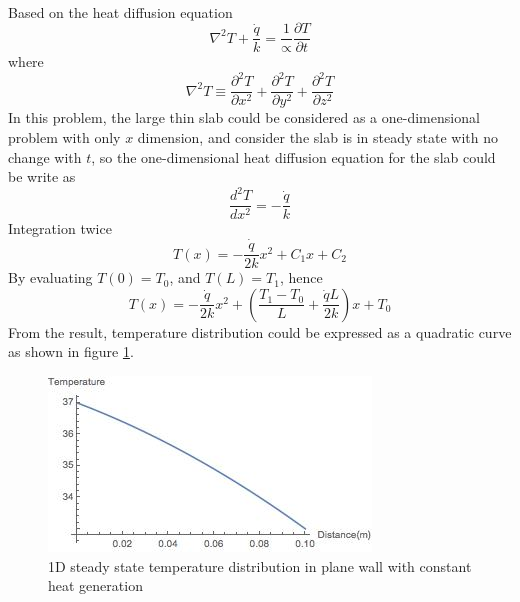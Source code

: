 \begin{solution}
~\\
Based on the heat diffusion equation 
$$\nabla^2 T+\frac{\dot{q}}{k}=\frac{1}{\propto}\frac{\partial T}{\partial t}$$
where
$$\nabla^2 T \equiv \frac{\partial^2 T}{\partial x^2}+
\frac{\partial^2 T}{\partial y^2}+
\frac{\partial^2 T}{\partial z^2}$$
In this problem, the large thin slab could be considered as a one-dimensional problem 
with only $x$ dimension, and consider the slab is in steady state with no change with $t$,
so the one-dimensional heat diffusion equation for the slab could be write as
$$\frac{d^2 T}{d x^2}=-\frac{\dot{q}}{k}$$
Integration twice
$$T(x)=-\frac{\dot{q}}{2k}x^2+C_1x+C_2$$
By evaluating $T(0)=T_0$, and $T(L)=T_1$, hence
$$T(x)=-\frac{\dot{q}}{2k}x^2+ \left(\frac{T_1-T_0}{L}+\frac{\dot{q}L}{2k}\right)x+T_0$$
From the result, temperature distribution could be expressed as a quadratic curve as shown in
figure \ref{fig:2:7}.
\begin{figure}[H]
  \centering
    \includegraphics[scale=1]{figures/ch2/7}
    \caption{1D steady state temperature distribution in plane wall with constant heat generation}
    \label{fig:2:7}
\end{figure}
\end{solution}

